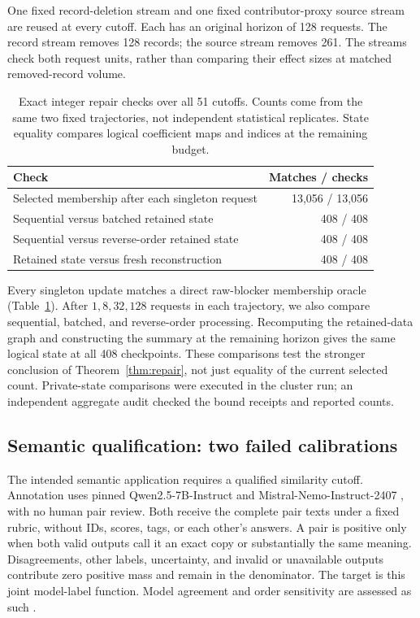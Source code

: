 One fixed record-deletion stream and one fixed contributor-proxy source
stream are reused at every cutoff. Each has an original horizon of 128
requests. The record stream removes 128 records; the source stream removes
261. The streams check both request units, rather than comparing their
effect sizes at matched removed-record volume.

\begin{table}[t]
\centering
\small
\caption{Exact integer repair checks over all 51 cutoffs. Counts come from
the same two fixed trajectories, not independent statistical replicates.
State equality compares logical coefficient maps and indices at the
remaining budget.}
\label{tab:repair}
\begin{tabular}{lr}
\hline
Check & Matches / checks\\
\hline
Selected membership after each singleton request & 13,056 / 13,056\\
Sequential versus batched retained state & 408 / 408\\
Sequential versus reverse-order retained state & 408 / 408\\
Retained state versus fresh reconstruction & 408 / 408\\
\hline
\end{tabular}
\end{table}

Every singleton update matches a direct raw-blocker membership oracle
(Table~\ref{tab:repair}). After $1,8,32,128$ requests in each trajectory,
we also compare sequential, batched, and reverse-order processing.
Recomputing the retained-data graph and constructing the summary at the
remaining horizon gives the same logical state at all 408 checkpoints.
These comparisons test the stronger conclusion of Theorem~\ref{thm:repair},
not just equality of the current selected count. Private-state comparisons
were executed in the cluster run; an independent aggregate audit checked
the bound receipts and reported counts.

\subsection{Semantic qualification: two failed calibrations}\label{sec:judges}
The intended semantic application requires a qualified similarity cutoff.
Annotation uses pinned Qwen2.5-7B-Instruct \citep{qwen} and
Mistral-Nemo-Instruct-2407 \citep{mistral}, with no human pair review.
Both receive the complete pair texts under a fixed rubric, without IDs,
scores, tags, or each other's answers. A pair is positive only when both
valid outputs call it an exact copy or substantially the same meaning.
Disagreements, other labels, uncertainty, and invalid or unavailable
outputs contribute zero positive mass and remain in the denominator.
The target is this joint model-label function. Model agreement and
order sensitivity are assessed as such \citep{judge}.

